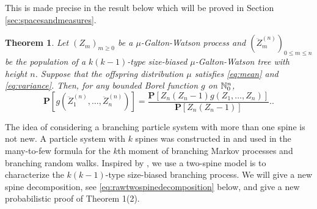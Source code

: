 \documentclass[12pt]{amsart}
\newtheorem{thm}{Theorem}[section]
\numberwithin{equation}{section}
\newcommand{\prob}{\mathbf P}
\newcommand{\expr}[1]{\left( #1 \right)}
\newcommand{\brac}[1]{\left[ #1 \right]}
\begin{document}
	This is made precise in the result below which will be proved in Section \ref{sec:spacesandmeasures}.
\begin{thm}
\label{thm:changeofmeasure}
	Let $(Z_m)_{m\ge 0}$ be a $\mu$-Galton-Watson process and
		$(\ddot Z_m^{(n)})_{0\le m\le n}$
	be the population of a $k(k-1)$-type size-biased $\mu$-Galton-Watson tree with height $n$.
	Suppose that the offspring distribution $\mu$ satisfies \eqref{eq:mean} and \eqref{eq:variance}. Then, for any bounded Borel function $g$ on $\mathbb N^{n}_0$,
\begin{equation*}
				 \prob\brac{g\expr{\ddot Z_1^{(n)},\dots,\ddot Z_n^{(n)}}}
	=
				 \frac{\prob\brac{Z_n(Z_n-1) g\expr{Z_1,\dots, Z_n}}}{\prob\brac{Z_n(Z_n-1)}}.			.
\end{equation*}
	\end{thm}
\par
	The idea of considering a branching particle system with more than one spine is not new.
	A particle system with $k$ spines  was constructed in \cite{harris2015many} and used in the  many-to-few formula for the $k$th moment of branching Markov processes and branching random walks. Inspired by \cite{harris2015many}, we use a two-spine model is to characterize the $k(k-1)$-type size-biased branching process.
We will give a new spine decomposition, see \eqref{eq:rawtwospinedecomposition} below, and give a new probabilistic proof of Theorem 1(2).
\end{document}

